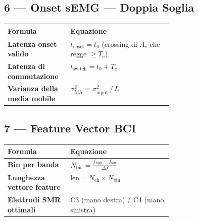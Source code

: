\documentclass[10pt, letterpaper]{report}
\begin{document}
\subsection*{\large 6 \;—\; Onset sEMG — Doppia Soglia}
\begin{tabularx}{\linewidth}{>{\bfseries}p{0.38\linewidth} X}
\toprule
Formula & Equazione \\ \midrule
Latenza onset valido &
  $t_{\mathrm{onset}}=t_0$
  \quad (crossing di $A_c$ che regge $\ge T_c$) \\
Latenza di commutazione &
  $t_{\mathrm{switch}} = t_0 + T_c$ \\
Varianza della media mobile &
  $\sigma^2_{\mathrm{MA}} = \sigma^2_{\mathrm{input}}\,/\,L$ \\
\bottomrule
\end{tabularx}

\bigskip
\subsection*{\large 7 \;—\; Feature Vector BCI}
\begin{tabularx}{\linewidth}{>{\bfseries}p{0.38\linewidth} X}
\toprule
Formula & Equazione \\ \midrule
Bin per banda &
  $\displaystyle N_{\mathrm{bin}}
   = \frac{f_{\mathrm{high}}-f_{\mathrm{low}}}{\Delta f}$ \\
Lunghezza vettore feature &
  $\mathrm{len} = N_{\mathrm{ch}}\times N_{\mathrm{bin}}$ \\
Elettrodi SMR ottimali &
  C3 (mano destra) / C4 (mano sinistra) \\
\bottomrule
\end{tabularx}

\bigskip
\end{document}
